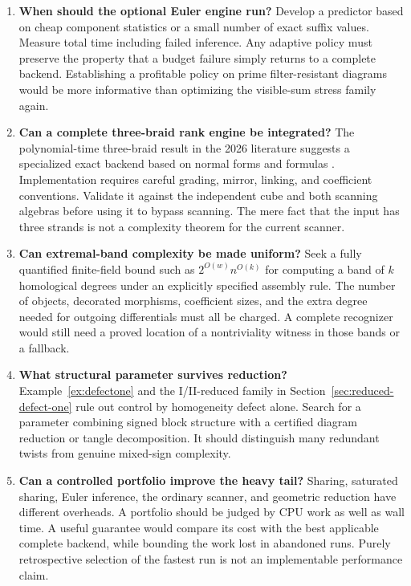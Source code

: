 \begin{enumerate}[label=\textbf{Q\arabic*.},leftmargin=*]
\item \textbf{When should the optional Euler engine run?}
Develop a predictor based on cheap component statistics or a small number
of exact suffix values. Measure total time including failed inference.
Any adaptive policy must preserve the property that a budget failure simply
returns to a complete backend. Establishing a profitable policy on prime
filter-resistant diagrams would be more informative than optimizing the
visible-sum stress family again.

\item \textbf{Can a complete three-braid rank engine be integrated?}
The polynomial-time three-braid result in the 2026 literature suggests a
specialized exact backend based on normal forms and formulas
\cite{kelomaki}. Implementation requires careful grading, mirror, linking,
and coefficient conventions. Validate it against the independent cube and
both scanning algebras before using it to bypass scanning. The mere fact
that the input has three strands is not a complexity theorem for the
current scanner.

\item \textbf{Can extremal-band complexity be made uniform?}
Seek a fully quantified finite-field bound such as
$2^{O(w)}n^{O(k)}$ for computing a band of $k$ homological degrees under an
explicitly specified assembly rule. The number of objects, decorated
morphisms, coefficient sizes, and the extra degree needed for outgoing
differentials must all be charged. A complete recognizer would still need a
proved location of a nontriviality witness in those bands or a fallback.

\item \textbf{What structural parameter survives reduction?}
Example~\ref{ex:defectone} and the I/II-reduced family in
Section~\ref{sec:reduced-defect-one} rule out control by homogeneity defect
alone. Search for a parameter combining signed block structure with a
certified diagram reduction or tangle decomposition. It should distinguish
many redundant twists from genuine mixed-sign complexity.

\item \textbf{Can a controlled portfolio improve the heavy tail?}
Sharing, saturated sharing, Euler inference, the ordinary scanner, and
geometric reduction have different overheads. A portfolio should be judged
by CPU work as well as wall time. A useful guarantee would compare its cost
with the best applicable complete backend, while bounding the work lost in
abandoned runs. Purely retrospective selection of the fastest run is not an
implementable performance claim.


\end{enumerate}
